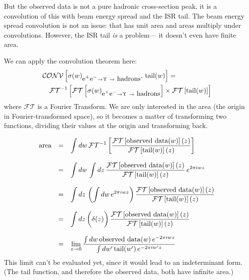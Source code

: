 \documentclass[12pt]{article}
\begin{document}
But the observed data is not a pure hadronic cross-section peak, it is
a convolution of this with beam energy spread and the ISR tail. The
beam energy spread convolution is not an issue: that has unit area and
areas multiply under convolutions. However, the ISR tail {\it is} a
problem--- it doesn't even have finite area.

We can apply the convolution theorem here:
\begin{eqnarray}
  \lefteqn{\mathcal{CONV}\left[ \sigma(w)_{\mbox{e$^+$e$^-$} \to \Upsilon\ \to \mbox{ hadrons}},\,
  \mbox{tail}(w) \right] =} \\
  \nonumber
  & & \mathcal{FT}^{-1} \left[
      \mathcal{FT}\left[ \sigma(w)_{\mbox{e$^+$e$^-$} \to \Upsilon\ \to \mbox{ hadrons}} \right] \times
      \mathcal{FT}\left[ \mbox{tail}(w) \right] \right]
\end{eqnarray}
where $\mathcal{FT}$ is a
Fourier Transform. We are only interested in the area (the origin in
Fourier-transformed space), so it becomes a matter of transforming two
functions, dividing their values at the origin and transforming back.

\begin{equation}
  \begin{array}{r c l}
    \mbox{area} &=& \displaystyle \int dw\,
      \mathcal{FT}^{-1} \left[
      \frac{\mathcal{FT}\left[ \mbox{observed data}(w) \right](z)}{\mathcal{FT}\left[ \mbox{tail}(w) \right](z)}
                       \right] \\
                & & \\
                &=& \displaystyle \int dw\, \int dz\,
      \frac{\mathcal{FT}\left[ \mbox{observed data}(w) \right](z)}{\mathcal{FT}\left[ \mbox{tail}(w) \right](z)}
      \, e^{2\pi i w z} \\
                & & \\
                &=& \displaystyle \int dz\, \left( \int dw\, e^{2\pi i w z} \right)
      \frac{\mathcal{FT}\left[ \mbox{observed data}(w) \right](z)}{\mathcal{FT}\left[ \mbox{tail}(w) \right](z)} \\
                & & \\
                &=& \displaystyle \int dz\, \bigg( \delta(z) \bigg) \,
      \frac{\mathcal{FT}\left[ \mbox{observed data}(w) \right](z)}{\mathcal{FT}\left[ \mbox{tail}(w) \right](z)} \\
                & & \\
                &=& \displaystyle \lim_{z \to 0}
      \frac{\int dw\, \mbox{observed data}(w) \, e^{-2\pi i w z}}{\int dw^{\prime}\, \mbox{tail}(w^{\prime}) \, e^{-2\pi i w^{\prime} z}}
  \end{array}
  \label{eq:alterarea_deriv}
\end{equation}
This limit can't be evaluated yet, since it would lead to an
indeterminant form. (The tail function, and therefore the observed
data, both have infinite area.)
\end{document}
